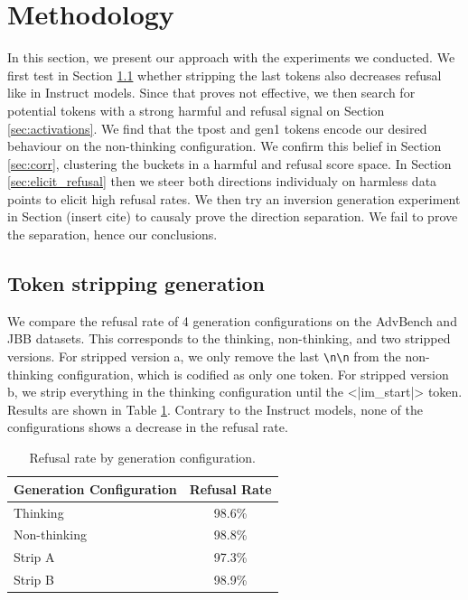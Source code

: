 \documentclass[nohyperref]{article}
\theoremstyle{plain}
\theoremstyle{definition}
\theoremstyle{remark}
\begin{document}
\section{Methodology}
In this section, we present our approach with the experiments we conducted. We first test in Section \ref{sec:strip} whether stripping the last tokens also decreases refusal like in Instruct models. Since that proves not effective, we then search for potential tokens with a strong harmful and refusal signal on Section \ref{sec:activations}. We find that the tpost and gen1 tokens encode our desired behaviour on the non-thinking configuration. We confirm this belief in Section \ref{sec:corr}, clustering the buckets in a harmful and refusal score space. In Section \ref{sec:elicit_refusal} then we steer both directions individualy on harmless data points to elicit high refusal rates. We then try an inversion generation experiment in Section (insert cite) to causaly prove the direction separation. We fail to prove the separation, hence our conclusions. 

\subsection{Token stripping generation} \label{sec:strip}
We compare the refusal rate of 4 generation configurations on the AdvBench and JBB datasets. This corresponds to the thinking, non-thinking, and two stripped versions. For stripped version a, we only remove the last \texttt{\textbackslash n\textbackslash n} from the non-thinking configuration, which is codified as only one token. For stripped version b, we strip everything in the thinking configuration until the <|im\_start|> token. Results are shown in Table \ref{tab:refusal-rate}. Contrary to the Instruct models, none of the configurations shows a decrease in the refusal rate.

\begin{table}[h]
\centering
\begin{tabular}{lc}
\hline
\textbf{Generation Configuration} & \textbf{Refusal Rate} \\
\hline
Thinking     & 98.6\% \\
Non-thinking & 98.8\% \\
Strip A      & 97.3\% \\
Strip B      & 98.9\% \\
\hline
\end{tabular}
\caption{Refusal rate by generation configuration.}
\label{tab:refusal-rate}
\end{table}
\end{document}
